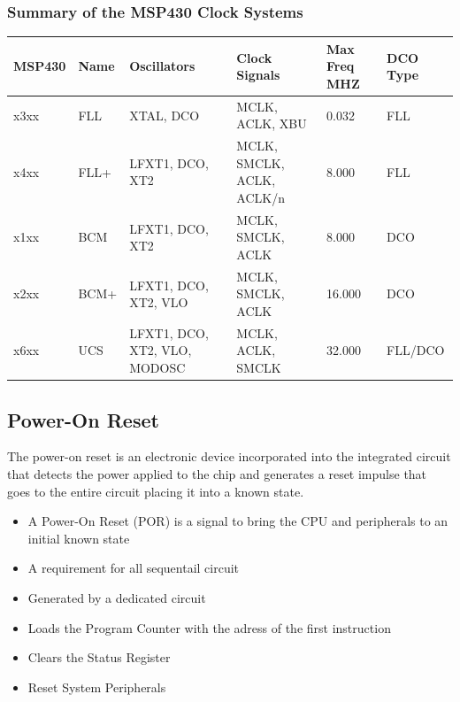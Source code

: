 \subsubsection{Summary of the MSP430 Clock Systems}
{\small 
\begin{tabular}{llllll}
    \textbf{MSP430}& \textbf{Name} & \textbf{Oscillators} & \textbf{Clock Signals} & \textbf{Max Freq MHZ} & \textbf{DCO Type} \\
    \hline
    x3xx           & FLL           & XTAL, DCO            & MCLK, ACLK, XBU        & 0.032                 & FLL                \\
    x4xx           & FLL+          & LFXT1, DCO, XT2      & MCLK, SMCLK, ACLK, ACLK/n  & 8.000             & FLL                \\
    x1xx           & BCM           & LFXT1, DCO, XT2      & MCLK, SMCLK, ACLK          & 8.000             & DCO                \\
    x2xx           & BCM+          & LFXT1, DCO, XT2, VLO & MCLK, SMCLK, ACLK          & 16.000            & DCO                \\
    x6xx           & UCS           & LFXT1, DCO, XT2, VLO, MODOSC & MCLK, ACLK, SMCLK  & 32.000            & FLL/DCO            \\
\end{tabular}
}
\subsection{Power-On Reset }
The power-on reset is an electronic device incorporated into the integrated circuit that detects the power applied to the chip and generates a reset impulse that goes to the entire circuit placing it into a known state.\\
\begin{itemize}
	\item A Power-On Reset (\acs{POR}) is a signal to bring the \acs{CPU} and peripherals to an initial known state
	\item A requirement for all sequentail circuit
	\item Generated by a dedicated circuit
	\item Loads the Program Counter with the adress of the first instruction
	\item Clears the Status Register
	\item Reset System Peripherals
\end{itemize}
